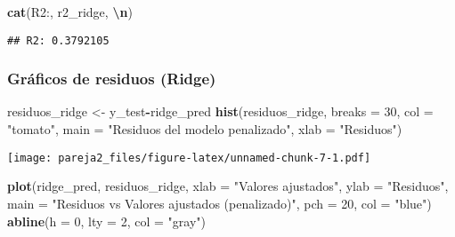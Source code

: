 \documentclass[
]{article}
\newenvironment{Shaded}{\begin{snugshade}}{\end{snugshade}}
\newcommand{\AttributeTok}[1]{\textcolor[rgb]{0.13,0.29,0.53}{#1}}
\newcommand{\DecValTok}[1]{\textcolor[rgb]{0.00,0.00,0.81}{#1}}
\newcommand{\FunctionTok}[1]{\textcolor[rgb]{0.13,0.29,0.53}{\textbf{#1}}}
\newcommand{\NormalTok}[1]{#1}
\newcommand{\OtherTok}[1]{\textcolor[rgb]{0.56,0.35,0.01}{#1}}
\newcommand{\SpecialCharTok}[1]{\textcolor[rgb]{0.81,0.36,0.00}{\textbf{#1}}}
\newcommand{\StringTok}[1]{\textcolor[rgb]{0.31,0.60,0.02}{#1}}
\begin{document}
\begin{Shaded}
\begin{Highlighting}[]
\FunctionTok{cat}\NormalTok{(}\StringTok{\textquotesingle{}R2:\textquotesingle{}}\NormalTok{, r2\_ridge, }\StringTok{\textquotesingle{}}\SpecialCharTok{\textbackslash{}n}\StringTok{\textquotesingle{}}\NormalTok{)}
\end{Highlighting}
\end{Shaded}

\begin{verbatim}
## R2: 0.3792105
\end{verbatim}

\hypertarget{gruxe1ficos-de-residuos-ridge}{%
\subsubsection{Gráficos de residuos
(Ridge)}\label{gruxe1ficos-de-residuos-ridge}}

\begin{Shaded}
\begin{Highlighting}[]
\NormalTok{residuos\_ridge }\OtherTok{\textless{}{-}}\NormalTok{ y\_test}\SpecialCharTok{{-}}\NormalTok{ridge\_pred}
\FunctionTok{hist}\NormalTok{(residuos\_ridge, }\AttributeTok{breaks =} \DecValTok{30}\NormalTok{, }\AttributeTok{col =} \StringTok{"tomato"}\NormalTok{, }\AttributeTok{main =} \StringTok{"Residuos del modelo penalizado"}\NormalTok{, }\AttributeTok{xlab =} \StringTok{"Residuos"}\NormalTok{)}
\end{Highlighting}
\end{Shaded}

\texttt{[image: pareja2\_files/figure-latex/unnamed-chunk-7-1.pdf]}

\begin{Shaded}
\begin{Highlighting}[]
\FunctionTok{plot}\NormalTok{(ridge\_pred, residuos\_ridge, }\AttributeTok{xlab =} \StringTok{"Valores ajustados"}\NormalTok{, }\AttributeTok{ylab =} \StringTok{"Residuos"}\NormalTok{, }\AttributeTok{main =} \StringTok{"Residuos vs Valores ajustados (penalizado)"}\NormalTok{, }\AttributeTok{pch =} \DecValTok{20}\NormalTok{, }\AttributeTok{col =} \StringTok{"blue"}\NormalTok{)}
\FunctionTok{abline}\NormalTok{(}\AttributeTok{h =} \DecValTok{0}\NormalTok{, }\AttributeTok{lty =} \DecValTok{2}\NormalTok{, }\AttributeTok{col =} \StringTok{"gray"}\NormalTok{)}
\end{Highlighting}
\end{Shaded}
\end{document}

